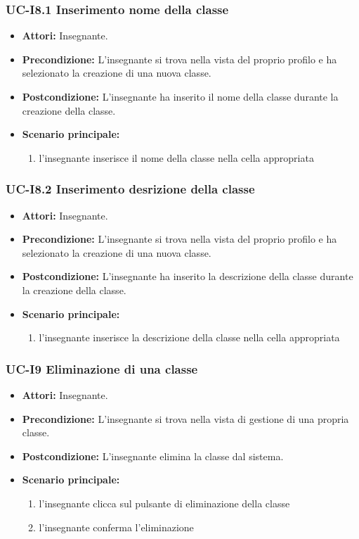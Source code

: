 \subsubsection{UC-I8.1 Inserimento nome della classe}
\begin{itemize}
	\item \textbf{Attori:} Insegnante.
	\item \textbf{Precondizione:} L'insegnante si trova nella vista del proprio profilo e ha selezionato la creazione di una nuova classe.
	\item \textbf{Postcondizione:} L'insegnante ha inserito il nome della classe durante la creazione della classe.
	\item \textbf{Scenario principale:}
	\begin{enumerate}
		\item l'insegnante inserisce il nome della classe nella cella appropriata
	\end{enumerate}
\end{itemize}

\subsubsection{UC-I8.2 Inserimento desrizione della classe}
\begin{itemize}
	\item \textbf{Attori:} Insegnante.
	\item \textbf{Precondizione:} L'insegnante si trova nella vista del proprio profilo e ha selezionato la creazione di una nuova classe.
	\item \textbf{Postcondizione:} L'insegnante ha inserito la descrizione della classe durante la creazione della classe.
	\item \textbf{Scenario principale:}
	\begin{enumerate}
		\item l'insegnante inserisce la descrizione della classe nella cella appropriata
	\end{enumerate}
\end{itemize}

\subsubsection{UC-I9 Eliminazione di una classe}
\begin{itemize}
	\item \textbf{Attori:} Insegnante.
	\item \textbf{Precondizione:} L'insegnante si trova nella vista di gestione di una propria classe.
	\item \textbf{Postcondizione:} L'insegnante elimina la classe dal sistema.
	\item \textbf{Scenario principale:}
	\begin{enumerate}
		\item l'insegnante clicca sul pulsante di eliminazione della classe
		\item l'insegnante conferma l'eliminazione
	\end{enumerate}
\end{itemize}

